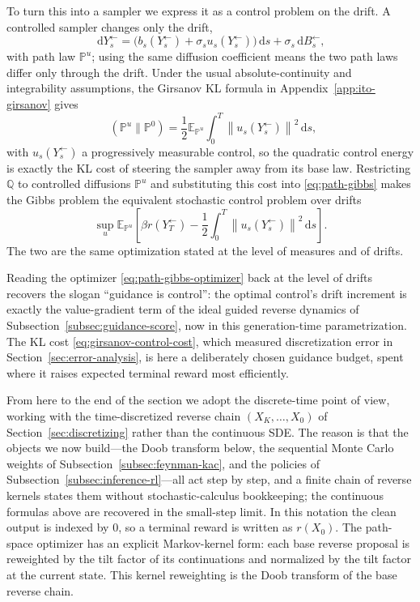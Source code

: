 \documentclass[10pt,a4paper]{amsart}
\numberwithin{equation}{section}
\DeclareMathOperator{\KL}{D_{\mathsf{KL}}}
\newcommand{\E}{\mathbb{E}}
\newcommand{\Pp}{\mathbb{P}}
\newcommand{\dd}{\,\mathrm{d}}
\newcommand{\norm}[1]{\left\lVert #1 \right\rVert}
\begin{document}
To turn this into a sampler we express it as a control problem on the drift.  A
controlled sampler changes only the drift,
\[
    \dd Y^{\leftarrow}_s=\bigl(b_s(Y^{\leftarrow}_s)+\sigma_s u_s(Y^{\leftarrow}_s)\bigr)\dd s+\sigma_s\dd B^{\leftarrow}_s,
\]
with path law $\Pp^u$; using the same diffusion coefficient means the two path
laws differ only through the drift.  Under the usual absolute-continuity and
integrability assumptions, the Girsanov KL formula in
Appendix~\ref{app:ito-girsanov} gives
\begin{equation}\label{eq:girsanov-control-cost}
    \KL(\Pp^u\|\Pp^0)
    =
    \frac12
    \E_{\Pp^u}\int_0^T\norm{u_s(Y^{\leftarrow}_s)}^2\dd s,
\end{equation}
with $u_s(Y^{\leftarrow}_s)$ a progressively measurable control, so the quadratic
control energy is exactly the KL cost of steering the sampler away from its base
law.  Restricting $\mathbb Q$ to controlled diffusions $\Pp^u$ and substituting
this cost into \eqref{eq:path-gibbs} makes the Gibbs problem the equivalent
stochastic control problem over drifts
\begin{equation}\label{eq:control-objective}
    \sup_u
    \E_{\Pp^u}\left[
    \beta r(Y^{\leftarrow}_T)
    -
    \frac12\int_0^T\norm{u_s(Y^{\leftarrow}_s)}^2\dd s
    \right].
\end{equation}
The two are the same optimization stated at the level of measures and of drifts.

Reading the optimizer \eqref{eq:path-gibbs-optimizer} back at the level of drifts
recovers the slogan ``guidance is control'': the optimal control's drift
increment is exactly the value-gradient term of the ideal guided reverse dynamics
of Subsection~\ref{subsec:guidance-score}, now in this generation-time
parametrization.  The KL cost \eqref{eq:girsanov-control-cost}, which measured
discretization error in Section~\ref{sec:error-analysis}, is here a deliberately
chosen guidance budget, spent where it raises expected terminal reward most
efficiently.

From here to the end of the section we adopt the discrete-time point of view,
working with the time-discretized reverse chain $(X_K,\ldots,X_0)$ of
Section~\ref{sec:discretizing} rather than the continuous SDE\@.  The reason is
that the objects we now build---the Doob transform below, the sequential Monte
Carlo weights of Subsection~\ref{subsec:feynman-kac}, and the policies of
Subsection~\ref{subsec:inference-rl}---all act step by step, and a finite chain
of reverse kernels states them without stochastic-calculus bookkeeping; the
continuous formulas above are recovered in the small-step limit.  In this
notation the clean output is indexed by $0$, so a terminal reward is written as
$r(X_0)$.  The path-space optimizer has an explicit Markov-kernel form: each
base reverse proposal is reweighted by the tilt factor of its continuations and
normalized by the tilt factor at the current state.  This kernel reweighting is
the Doob transform of the base reverse chain.
\end{document}
